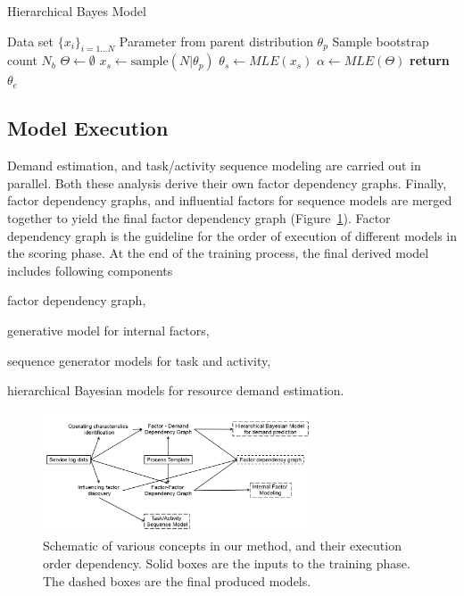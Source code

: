 \documentclass[twoside,leqno,twocolumn]{article}
\begin{document}
\begin{algorithm}
\caption{Hierarchical Bayes Model}
\label{algo2}
\begin{algorithmic}[1]
\State Data set ${\lbrace x_i \rbrace}_{i=1\dots N}$
\State Parameter from parent distribution ${\theta}_{p}$
\State Sample bootstrap count $N_{b}$
\State $\Theta \leftarrow \emptyset$
   \State $x_{s} \leftarrow \text{sample}( N \vert {\theta}_{p})$
   \State ${\theta}_{s} \leftarrow \textit{MLE}(x_s)$
\EndFor
\State $\alpha \leftarrow \textit{MLE}(\Theta)$
 
\State \textbf{return} ${\theta}_{e}$
\EndProcedure
\end{algorithmic}
\end{algorithm}

\subsection{Model Execution}
Demand estimation, and task/activity sequence modeling are carried out in parallel. Both these analysis derive their own factor dependency graphs. Finally, factor dependency graphs, and influential factors for sequence models are merged together to yield the final factor dependency graph (Figure~\ref{fig3}). Factor dependency graph is the guideline for the order of execution of different models in the scoring phase. At the end of the training process, the final derived model includes following components 
\begin{enumerate*}
	\item factor dependency graph,
    \item generative model for internal factors,
	\item sequence generator models for task and activity,
	\item hierarchical Bayesian models for resource demand estimation.
\end{enumerate*}

\begin{figure}[t]
\centering
\includegraphics[width=8cm]{fig3}
\caption{Schematic of various concepts in our method, and their execution order dependency. Solid boxes are the inputs to the training phase. The dashed boxes are the final produced models.}
\label{fig3}
\end{figure}
\end{document}
